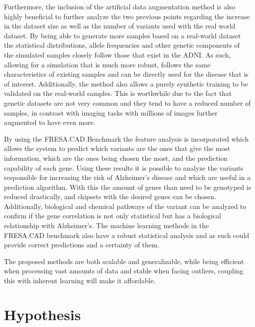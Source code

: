 Furthermore, the inclusion of the artificial data augmentation method is also highly beneficial to further analyze the two previous points regarding the increase in the dataset size as well as the number of variants used with the real world dataset. By being able to generate more samples based on a real-world dataset the statistical distributions, allele frequencies and other genetic components of the simulated samples closely follow those that exist in the ADNI. As such, allowing for a simulation that is much more robust, follows the same characteristics of existing samples and can be directly used for the disease that is of interest. Additionally, the method also allows a purely synthetic training to be validated on the real-world samples. This is worthwhile due to the fact that genetic datasets are not very common and they tend to have a reduced number of samples, in contrast with imaging tasks with millions of images further augmented to have even more.

By using the FRESA.CAD Benchmark the feature analysis is incorporated which allows the system to predict which variants are the ones that give the most information, which are the ones being chosen the most, and the prediction capability of each gene. Using these results it is possible to analyze the variants responsible for increasing the risk of Alzheimer's disease and which are useful in a prediction algorithm. With this the amount of genes than need to be genotyped is reduced drastically, and chipsets with the desired genes can be chosen. Additionally, biological and chemical pathways of the variant can be analyzed to confirm if the gene correlation is not only statistical but has a biological relationship with Alzheimer's. The machine learning methods in the FRESA.CAD benchmark also have a robust statistical analysis and as such could provide correct predictions and a certainty of them.

The proposed methods are both scalable and generalizable, while being efficient when processing vast amounts of data and stable when facing outliers, coupling this with inherent learning will make it affordable.


\section{Hypothesis} \label{hypothesis}

